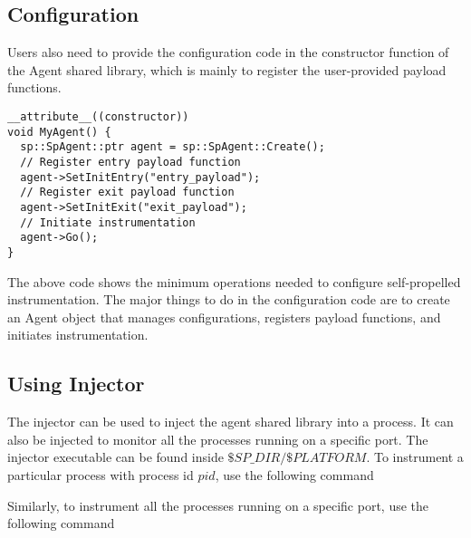 \subsection{Configuration}
Users also need to provide the configuration code in the constructor
function of
the Agent shared library, which is mainly to register the user-provided payload
functions.
\lstset{numbers=left}
\begin{lstlisting}[caption=Configuration code]
__attribute__((constructor))
void MyAgent() {
  sp::SpAgent::ptr agent = sp::SpAgent::Create();
  // Register entry payload function
  agent->SetInitEntry("entry_payload");
  // Register exit payload function
  agent->SetInitExit("exit_payload");
  // Initiate instrumentation
  agent->Go();
}
\end{lstlisting}
The above code shows the minimum operations needed to configure self-propelled
instrumentation.  The major things to do in the configuration code are to create
an Agent object that manages configurations, registers payload functions, and
initiates instrumentation.

\subsection{Using Injector}
The injector can be used to inject the agent shared library into a process. It
can also be injected to monitor all the processes running on a specific
port. The injector executable can be found inside $\$SP\_DIR/\$PLATFORM$. To
instrument a particular process with process id $pid$, use the following command


Similarly, to instrument all the processes running on a specific port,
use the following command


